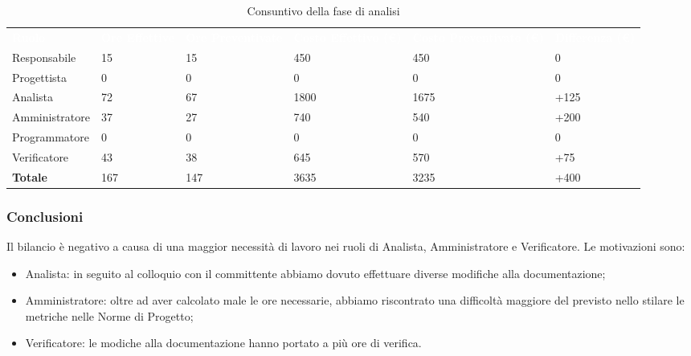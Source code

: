 \begin{table}[!htbp]
\begin{center}
\renewcommand{\arraystretch}{1.5}
\begin{tabular}{ m{}<{\centering}  m{}<{\centering} m{}<{\centering} m{}<{\centering} m{}<{\centering} m{}<{\centering}}
	\rowcolor{darkblue}
	\textcolor{white}{\textbf{Ruolo}} & \textcolor{white}{\textbf{Ore Effettive}} & \textcolor{white}{\textbf{Ore Preventivate}}&\textcolor{white}{\textbf{Costo Effettivo (\euro) }}&\textcolor{white}{\textbf{Costo Preventivato (\euro)}}&\textcolor{white}{\textbf{Differenza (\euro)}}\\ 

	Responsabile  & 15 & 15 & 450 & 450 & 0\\	
	
	Progettista & 0 & 0 & 0 & 0 & 0\\
	
	Analista & 72 & 67 & 1800 & 1675 & +125\\
	
	Amministratore & 37 & 27 & 740 & 540 & +200\\
	
	Programmatore & 0 & 0 &0 &0 & 0\\
	
	Verificatore & 43 & 38 & 645 & 570 & +75\\
	
	\textbf{Totale} & 167 & 147 & 3635 & 3235 & +400\\
	
\end{tabular}
\caption{Consuntivo della fase di analisi}
\end{center}
\end{table}

\subsubsection{Conclusioni}
Il bilancio è negativo a causa di una maggior necessità di lavoro nei ruoli di Analista,  Amministratore e Verificatore.  Le motivazioni sono:
\begin{itemize}
\item Analista: in seguito al colloquio con il committente abbiamo dovuto effettuare diverse modifiche alla documentazione;
\item Amministratore: oltre ad aver calcolato male le ore necessarie,  abbiamo riscontrato una difficoltà maggiore del previsto nello stilare le metriche nelle Norme di Progetto;
\item Verificatore: le modiche alla documentazione hanno portato a più ore di verifica.
\end{itemize}

